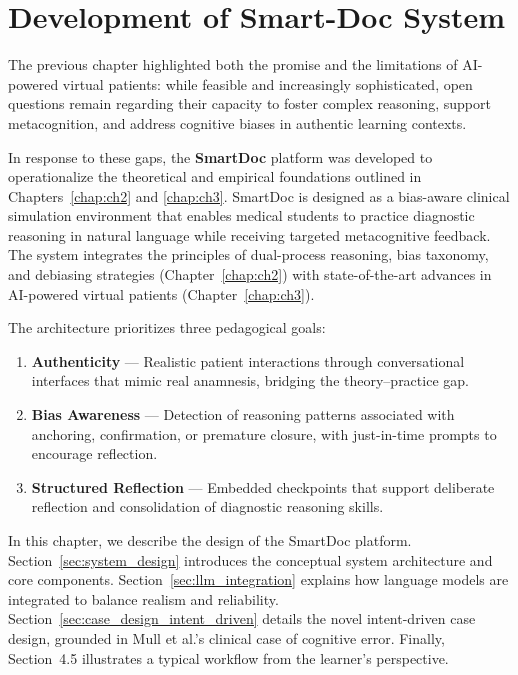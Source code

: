 \chapter{Development of Smart-Doc System} 
\label{chap:ch4}

The previous chapter highlighted both the promise and the limitations of
AI-powered virtual patients: while feasible and increasingly sophisticated,
open questions remain regarding their capacity to foster complex reasoning,
support metacognition, and address cognitive biases in authentic learning
contexts. 

In response to these gaps, the \textbf{SmartDoc} platform was developed to
operationalize the theoretical and empirical foundations outlined in
Chapters~\ref{chap:ch2} and \ref{chap:ch3}. SmartDoc is designed as a
bias-aware clinical simulation environment that enables medical students to
practice diagnostic reasoning in natural language while receiving targeted
metacognitive feedback. The system integrates the principles of dual-process
reasoning, bias taxonomy, and debiasing strategies
(Chapter~\ref{chap:ch2}) with state-of-the-art advances in AI-powered virtual
patients (Chapter~\ref{chap:ch3}).

The architecture prioritizes three pedagogical goals:
\begin{enumerate}
    \item \textbf{Authenticity} — Realistic patient interactions through conversational interfaces that mimic real anamnesis, bridging the theory–practice gap.
    \item \textbf{Bias Awareness} — Detection of reasoning patterns associated with anchoring, confirmation, or premature closure, with just-in-time prompts to encourage reflection.
    \item \textbf{Structured Reflection} — Embedded checkpoints that support deliberate reflection and consolidation of diagnostic reasoning skills.
\end{enumerate}


In this chapter, we describe the design of the SmartDoc platform. Section~\ref{sec:system_design} introduces the conceptual system architecture and core components. Section~\ref{sec:llm_integration} explains how language models are integrated to balance realism and reliability. Section~\ref{sec:case_design_intent_driven} details the novel intent-driven case design, grounded in Mull et al.'s clinical case of cognitive error. Finally, Section~4.5 illustrates a typical workflow from the learner’s perspective.

